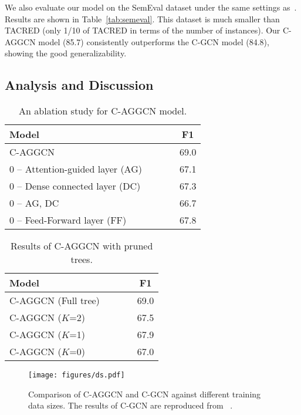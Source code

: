 \documentclass[11pt,a4paper]{article}
\begin{document}
We also evaluate our model on the SemEval dataset under the same settings as~\citep{Zhang2018GraphCO}. Results are shown in Table~\ref{tab:semeval}. This dataset is much smaller than TACRED (only 1/10 of TACRED in terms of the number of instances). Our C-AGGCN model (85.7) consistently outperforms the  C-GCN model (84.8), showing the good  generalizability.




\subsection{Analysis and Discussion}

\begin{table}[!t]
\centering
\setlength{\tabcolsep}{3pt}
\begin{tabular}{lcccc}
\toprule
\bf Model & & & &F1 \\
\midrule
C-AGGCN              & & & & 69.0\\
{\color{white}0}   -- Attention-guided layer (AG) &  & & & 67.1\\
{\color{white}0}   -- Dense connected layer (DC)  &  & & & 67.3 \\
{\color{white}0}   -- AG, DC   &  & & &66.7\\
{\color{white}0}   -- Feed-Forward layer (FF)    &  & & & 67.8\\
\bottomrule
\end{tabular}
\caption{An ablation study for C-AGGCN model. }
\label{tab:ablation}
\end{table}

 

\begin{table}[!t]
\centering
\setlength{\tabcolsep}{3pt}
\begin{tabular}{lcccc}
\toprule
\bf Model & & & &F1 \\
\midrule
C-AGGCN (Full tree)             & & & & 69.0\\
C-AGGCN ($K$=2)             & & & & 67.5\\
C-AGGCN ($K$=1)             & & & & 67.9\\
C-AGGCN ($K$=0)             & & & & 67.0\\
\bottomrule
\end{tabular}
\caption{Results of C-AGGCN with pruned trees.}
\label{tab:prune_tree}
\end{table}

 
\begin{figure*}
    \centering
    \texttt{[image: figures/ds.pdf]}
\caption{Comparison of C-AGGCN and C-GCN against different training data sizes. The results of C-GCN are reproduced from ~\cite{Zhang2018GraphCO}.}
    \label{fig:comp}
\end{figure*}
\end{document}
